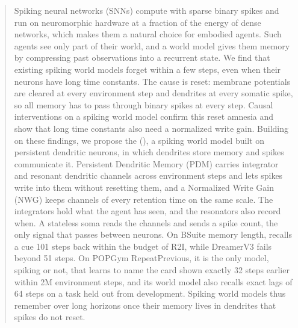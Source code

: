 \begin{abstract}
Spiking neural networks (SNNs) compute with sparse binary spikes and run on neuromorphic hardware at a fraction of the energy of dense networks, which makes them a natural choice for embodied agents.
Such agents see only part of their world, and a world model gives them memory by compressing past observations into a recurrent state.
We find that existing spiking world models forget within a few steps, even when their neurons have long time constants.
The cause is reset: membrane potentials are cleared at every environment step and dendrites at every somatic spike, so all memory has to pass through binary spikes at every step.
Causal interventions on a spiking world model confirm this reset amnesia and show that long time constants also need a normalized write gain.
Building on these findings, we propose the \methodfull (\method), a spiking world model built on persistent dendritic neurons, in which dendrites store memory and spikes communicate it.
Persistent Dendritic Memory (PDM) carries integrator and resonant dendritic channels across environment steps and lets spikes write into them without resetting them, and a Normalized Write Gain (NWG) keeps channels of every retention time on the same scale.
The integrators hold what the agent has seen, and the resonators also record when.
A stateless soma reads the channels and sends a spike count, the only signal that passes between neurons.
On BSuite memory length, \method recalls a cue 101 steps back within the budget of R2I, while DreamerV3 fails beyond 51 steps.
On POPGym RepeatPrevious, it is the only model, spiking or not, that learns to name the card shown exactly 32 steps earlier within 2M environment steps, and its world model also recalls exact lags of 64 steps on a task held out from development.
Spiking world models thus remember over long horizons once their memory lives in dendrites that spikes do not reset.
\end{abstract}
